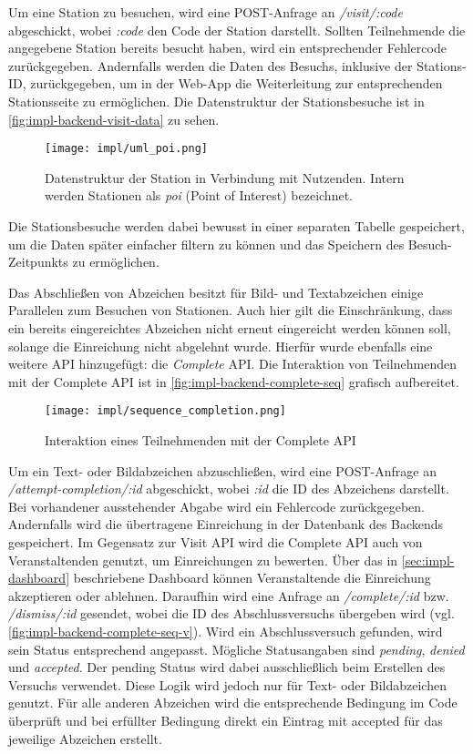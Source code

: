 Um eine Station zu besuchen, wird eine POST-Anfrage an \textit{/visit/:code}
abgeschickt, wobei \textit{:code} den Code der Station darstellt. Sollten
Teilnehmende die angegebene Station bereits besucht haben, wird ein
entsprechender Fehlercode zurückgegeben. Andernfalls werden die Daten des
Besuchs, inklusive der Stations-ID, zurückgegeben, um in der Web-App die
Weiterleitung zur entsprechenden Stationsseite zu ermöglichen. Die Datenstruktur
der Stationsbesuche ist in \autoref{fig:impl-backend-visit-data} zu sehen.

\begin{figure}[htpb]
    \centering
    \texttt{[image: impl/uml\_poi.png]}
    \caption{Datenstruktur der Station in Verbindung mit Nutzenden. Intern werden Stationen als \textit{poi} (Point of Interest)
        bezeichnet.}
    \label{fig:impl-backend-visit-data}
\end{figure}

Die Stationsbesuche werden dabei bewusst in einer separaten Tabelle gespeichert,
um die Daten später einfacher filtern zu können und das Speichern des
Besuch-Zeitpunkts zu ermöglichen.

Das Abschließen von Abzeichen besitzt für Bild- und Textabzeichen einige
Parallelen zum Besuchen von Stationen. Auch hier gilt die Einschränkung, dass
ein bereits eingereichtes Abzeichen nicht erneut eingereicht werden können soll,
solange die Einreichung nicht abgelehnt wurde. Hierfür wurde ebenfalls eine
weitere API hinzugefügt: die \textit{Complete} API. Die Interaktion von
Teilnehmenden mit der Complete API ist in
\autoref{fig:impl-backend-complete-seq} grafisch aufbereitet.

\begin{figure}[ht]
    \centering
    \texttt{[image: impl/sequence\_completion.png]}
    \caption{Interaktion eines Teilnehmenden mit der Complete API}
    \label{fig:impl-backend-complete-seq}
\end{figure}

Um ein Text- oder Bildabzeichen abzuschließen, wird eine POST-Anfrage an
\textit{/attempt-completion/:id} abgeschickt, wobei \textit{:id} die ID des
Abzeichens darstellt. Bei vorhandener ausstehender Abgabe wird ein Fehlercode
zurückgegeben. Andernfalls wird die übertragene Einreichung in der Datenbank des
Backends gespeichert. Im Gegensatz zur Visit API wird die Complete API auch von
Veranstaltenden genutzt, um Einreichungen zu bewerten. Über das in
\autoref{sec:impl-dashboard} beschriebene Dashboard können Veranstaltende die
Einreichung akzeptieren oder ablehnen. Daraufhin wird eine Anfrage an
\textit{/complete/:id} bzw. \textit{/dismiss/:id} gesendet, wobei die ID des
Abschlussversuchs übergeben wird (vgl.
\autoref{fig:impl-backend-complete-seq-v}). Wird ein Abschlussversuch gefunden,
wird sein Status entsprechend angepasst. Mögliche Statusangaben sind
\textit{pending}, \textit{denied} und \textit{accepted}. Der pending Status wird
dabei ausschließlich beim Erstellen des Versuchs verwendet. Diese Logik wird
jedoch nur für Text- oder Bildabzeichen genutzt. Für alle anderen Abzeichen wird
die entsprechende Bedingung im Code überprüft und bei erfüllter Bedingung direkt
ein Eintrag mit accepted für das jeweilige Abzeichen erstellt.

